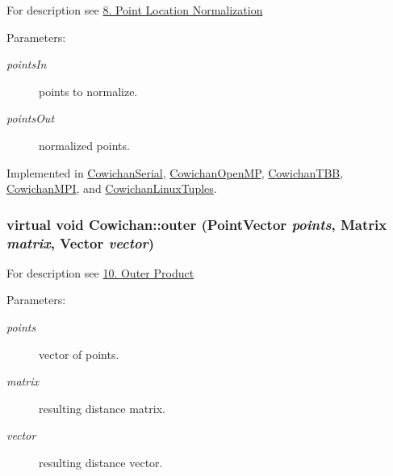 For description see \hyperlink{index_norm_sec}{8. Point Location Normalization} \begin{Desc}
\item[Parameters:]
\begin{description}
\item[{\em pointsIn}]points to normalize. \item[{\em pointsOut}]normalized points. \end{description}
\end{Desc}


Implemented in \hyperlink{class_cowichan_serial_0eeb47447c6a6b94ff7c6999c96fda0e}{CowichanSerial}, \hyperlink{class_cowichan_open_m_p_4ffbe36816235bc6abec30eae2be2d78}{CowichanOpenMP}, \hyperlink{class_cowichan_t_b_b_ca08645b51a242317a115cd7ce7d81fe}{CowichanTBB}, \hyperlink{class_cowichan_m_p_i_11df49e804427d4a0d085f4cff9302d0}{CowichanMPI}, and \hyperlink{class_cowichan_linux_tuples_922209c219bb5b9268263dae4000ea81}{CowichanLinuxTuples}.\hypertarget{class_cowichan_52f17221019290b88334b0ca7f3bcdb9}{
\subsubsection[{outer}]{\setlength{\rightskip}{0pt plus 5cm}virtual void Cowichan::outer ({\bf PointVector} {\em points}, \/  {\bf Matrix} {\em matrix}, \/  {\bf Vector} {\em vector})}}
\label{class_cowichan_52f17221019290b88334b0ca7f3bcdb9}


For description see \hyperlink{index_outer_sec}{10. Outer Product} \begin{Desc}
\item[Parameters:]
\begin{description}
\item[{\em points}]vector of points. \item[{\em matrix}]resulting distance matrix. \item[{\em vector}]resulting distance vector. \end{description}
\end{Desc}


